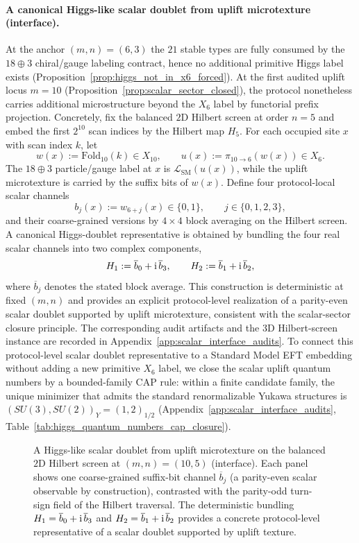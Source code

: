 \paragraph{A canonical Higgs-like scalar doublet from uplift microtexture (interface).}
\InterfaceTag At the anchor $(m,n)=(6,3)$ the $21$ stable types are fully consumed by the $18\oplus 3$ chiral/gauge labeling contract, hence no additional primitive Higgs label exists (Proposition~\ref{prop:higgs_not_in_x6_forced}).
At the first audited uplift locus $m=10$ (Proposition~\ref{prop:scalar_sector_closed}), the protocol nonetheless carries additional microstructure beyond the $X_6$ label by functorial prefix projection.
Concretely, fix the balanced $2$D Hilbert screen at order $n=5$ and embed the first $2^{10}$ scan indices by the Hilbert map $H_5$.
For each occupied site $x$ with scan index $k$, let
\[
w(x):=\mathrm{Fold}_{10}(k)\in X_{10},
\qquad
u(x):=\pi_{10\to 6}(w(x))\in X_6.
\]
The $18\oplus 3$ particle/gauge label at $x$ is $\mathcal{L}_{\mathrm{SM}}(u(x))$, while the uplift microtexture is carried by the suffix bits of $w(x)$.
Define four protocol-local scalar channels
\[
b_j(x):=w_{6+j}(x)\in\{0,1\},
\qquad j\in\{0,1,2,3\},
\]
and their coarse-grained versions by $4\times 4$ block averaging on the Hilbert screen.
\InterfaceTag A canonical Higgs-doublet representative is obtained by bundling the four real scalar channels into two complex components,
\[
H_1:=\overline{b}_0+\mathrm{i}\,\overline{b}_3,
\qquad
H_2:=\overline{b}_1+\mathrm{i}\,\overline{b}_2,
\]
where $\overline{b}_j$ denotes the stated block average.
This construction is deterministic at fixed $(m,n)$ and provides an explicit protocol-level realization of a parity-even scalar doublet supported by uplift microtexture, consistent with the scalar-sector closure principle.
The corresponding audit artifacts and the $3$D Hilbert-screen instance are recorded in Appendix~\ref{app:scalar_interface_audits}.
To connect this protocol-level scalar doublet representative to a Standard Model EFT embedding without adding a new primitive $X_6$ label, we close the scalar uplift quantum numbers by a bounded-family CAP rule: within a finite candidate family, the unique minimizer that admits the standard renormalizable Yukawa structures is $(SU(3),SU(2))_Y=(1,2)_{1/2}$ (Appendix~\ref{app:scalar_interface_audits}, Table~\ref{tab:higgs_quantum_numbers_cap_closure}).

\begin{figure}[t]
\centering
{}
\caption{A Higgs-like scalar doublet from uplift microtexture on the balanced $2$D Hilbert screen at $(m,n)=(10,5)$ (interface). Each panel shows one coarse-grained suffix-bit channel $\overline b_j$ (a parity-even scalar observable by construction), contrasted with the parity-odd turn-sign field of the Hilbert traversal. The deterministic bundling $H_1=\overline b_0+\mathrm{i}\,\overline b_3$ and $H_2=\overline b_1+\mathrm{i}\,\overline b_2$ provides a concrete protocol-level representative of a scalar doublet supported by uplift texture.}
\label{fig:higgs_doublet_structure_m10_2d}
\end{figure}

